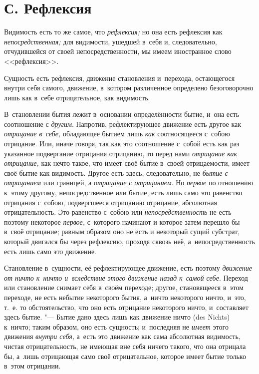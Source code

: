 \section[С. Рефлексия]{С. Рефлексия}
Видимость есть то же самое, что
{\em рефлексия;} но она есть рефлексия как
{\em непосредственная;} для видимости, ушедшей в~себя
и, следовательно, отчудившейся от своей непосредственности, мы имеем
иностранное слово <<рефлексия>>.

Сущность есть рефлексия, движение становления и~перехода, остающегося внутри
себя самого, движение, в~котором различенное определено безоговорочно лишь
как в~себе отрицательное, как видимость.

В~становлении бытия лежит в~основании определённости бытие, и~она есть
соотношение с {\em другим}. Напротив, рефлектирующее
движение есть другое как {\em отрицание в~себе,}
обладающее бытием лишь {\em как} соотносящееся с~собою
отрицание. Или, иначе говоря, так как это соотношение с~собой есть как раз
указанное подвергание отрицания отрицанию, то перед нами
{\em отрицание как отрицание,} как нечто такое, что
имеет своё бытие в~своей отрицаемости, имеет своё бытие как видимость.
Другое есть здесь, следовательно, не {\em бытие с
отрицанием} или границей, а {\em отрицание с
отрицанием}. Но {\em первое} по отношению к~этому
другому, непосредственное или бытие, есть лишь само это равенство отрицания
с~собою, подвергшееся отрицанию отрицание, абсолютная отрицательность. Это
равенство с~собою или {\em непосредственность} не есть
поэтому некоторое {\em первое,} с~которого начинают и
которое затем перешло бы в~своё отрицание; равным образом оно не есть и
некоторый сущий субстрат, который двигался бы через рефлексию, проходя
сквозь неё, а~непосредственность есть лишь само это движение.

Становление в~сущности, её рефлектирующее движение, есть поэтому
{\em движение от ничто к~ничто и~вследствие этого
движение назад к~самой себе}. Переход или становление снимает себя в~своём
переходе; другое, становящееся в~этом переходе, не есть небытие некоторого
бытия, а~ничто некоторого ничто, и~это, т.~е. то обстоятельство, что оно
есть отрицание некоторого ничто, и~составляет здесь бытие. "--- Бытие дано
здесь лишь как движение ничто (des Nichts) к~ничто; таким образом, оно есть
сущность; и~последняя не {\em имеет} этого движения
{\em внутри себя,} а~есть это движение как сама
абсолютная видимость, чистая отрицательность, не имеющая вне себя ничего
такого, что она отрицала бы, а~лишь отрицающая само своё отрицательное,
которое имеет бытие только в~этом отрицании.

